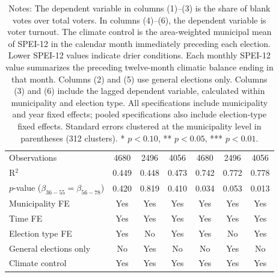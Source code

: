 \begin{table}[!h]
\begin{tabular}[t]{lcccccc}
\addlinespace
Observations & 4680 & 2496 & 4056 & 4680 & 2496 & 4056\\
R$^2$ & 0.449 & 0.448 & 0.473 & 0.742 & 0.772 & 0.778\\
$p$-value ($\beta_{36{-}55} = \beta_{56{-}78}$) & 0.420 & 0.819 & 0.410 & 0.034 & 0.053 & 0.013\\
Municipality FE & Yes & Yes & Yes & Yes & Yes & Yes\\
Time FE & Yes & Yes & Yes & Yes & Yes & Yes\\
Election type FE & Yes & No & Yes & Yes & No & Yes\\
General elections only & No & Yes & No & No & Yes & No\\
Climate control & Yes & Yes & Yes & Yes & Yes & Yes\\
\hline
\end{tabular}
\vspace{0.3em}
\captionsetup{justification=justified, singlelinecheck=false}
\caption*{\footnotesize Notes: The dependent variable in columns (1)--(3) is the share of blank votes over total voters. In columns (4)--(6), the dependent variable is voter turnout. The climate control is the area-weighted municipal mean of SPEI-12 in the calendar month immediately preceding each election. Lower SPEI-12 values indicate drier conditions. Each monthly SPEI-12 value summarizes the preceding twelve-month climatic balance ending in that month. Columns (2) and (5) use general elections only. Columns (3) and (6) include the lagged dependent variable, calculated within municipality and election type. All specifications include municipality and year fixed effects; pooled specifications also include election-type fixed effects. Standard errors clustered at the municipality level in parentheses (312 clusters). * $p<0.10$, ** $p<0.05$, *** $p<0.01$.}
\end{table}
